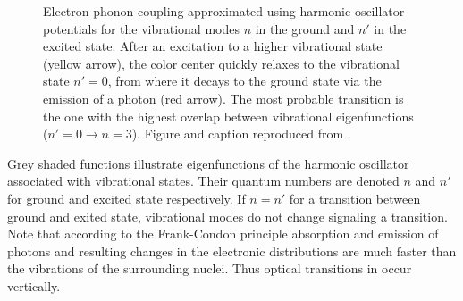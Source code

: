     \begin{figure}[!htb]
     \centering
     \caption[Electron-phonon coupling approximated]{Electron phonon coupling approximated using harmonic oscillator potentials for the vibrational modes $n$ in the ground and $n'$ in the excited state. After an excitation to a higher vibrational state (yellow arrow), the color center quickly relaxes to the vibrational state $n' = 0$, from where it decays to the ground state via the emission of a photon (red arrow). The most probable transition is the one with the highest overlap between vibrational eigenfunctions ($n' = 0 \to n = 3$). Figure and caption reproduced from \cite{Hepp2014dissertation}.}
     \label{fig::harmonic_model}
    \end{figure}

    Grey shaded functions illustrate eigenfunctions of the harmonic oscillator associated with vibrational states. Their quantum numbers are denoted $n$ and $n'$ for ground and excited state respectively. If $n = n'$ for a transition between ground and exited state, vibrational modes do not change signaling a \zpl transition. Note that according to the Frank-Condon principle \cite{condon1947franck} absorption and emission of photons and resulting changes in the electronic distributions are much faster than the vibrations of the surrounding nuclei. Thus optical transitions in  occur vertically. 

